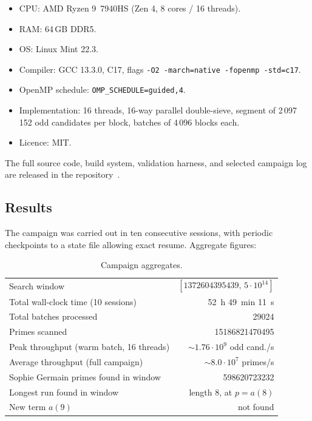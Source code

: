 \documentclass[11pt,a4paper]{article}
\theoremstyle{definition}
\begin{document}
\begin{itemize}
\item CPU: AMD Ryzen 9~7940HS (Zen 4, 8 cores / 16 threads).
\item RAM: 64\,GB DDR5.
\item OS: Linux Mint 22.3.
\item Compiler: GCC 13.3.0, C17, flags
\verb|-O2 -march=native -fopenmp -std=c17|.
\item OpenMP schedule: \texttt{OMP\_SCHEDULE=guided,4}.
\item Implementation: 16 threads, 16-way parallel double-sieve, segment
of 2\,097\,152 odd candidates per block, batches of 4\,096 blocks each.
\item Licence: MIT.
\end{itemize}

The full source code, build system, validation harness, and selected
campaign log are released in the repository~\cite{repo}.

\subsection{Results}

The campaign was carried out in ten consecutive sessions, with periodic
checkpoints to a state file allowing exact resume. Aggregate figures:

\begin{table}[ht]
\centering
\caption{Campaign aggregates.}
\label{tab:campaign}
\begin{tabular}{lr}
\toprule
Search window & $[\num{1372604395439},\,5\cdot 10^{14}]$ \\
Total wall-clock time (10 sessions) & 52~h 49~min 11~s \\
Total batches processed & \num{29024} \\
Primes scanned & \num{15186821470495} \\
Peak throughput (warm batch, 16 threads) & ${\sim}1.76\cdot 10^{9}$ odd cand./s \\
Average throughput (full campaign) & ${\sim}8.0\cdot 10^{7}$ primes/s \\
Sophie Germain primes found in window & \num{598620723232} \\
Longest run found in window & length 8, at $p = a(8)$ \\
New term $a(9)$ & not found \\
\bottomrule
\end{tabular}
\end{table}
\end{document}
